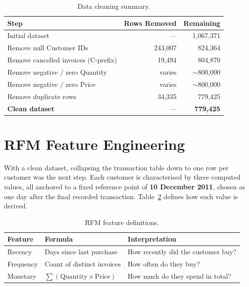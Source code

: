 \documentclass[12pt, a4paper]{article}
\begin{document}
\begin{table}[H]
\centering
\caption{Data cleaning summary.}
\label{tab:cleaning_summary}
\begin{tabular}{@{}lrr@{}}
\toprule
\textbf{Step} & \textbf{Rows Removed} & \textbf{Remaining} \\
\midrule
Initial dataset                      & ---       & 1,067,371 \\
Remove null Customer IDs             & 243,007   & 824,364   \\
Remove cancelled invoices (C-prefix) & 19,494    & 804,870   \\
Remove negative / zero Quantity      & varies    & $\sim$800,000 \\
Remove negative / zero Price         & varies    & $\sim$800,000 \\
Remove duplicate rows                & 34,335    & 779,425   \\
\midrule
\textbf{Clean dataset}              & ---       & \textbf{779,425} \\
\bottomrule
\end{tabular}
\end{table}

\section{RFM Feature Engineering}\label{sec:rfm}

With a clean dataset, collapsing the transaction table down to one row per customer was the next step. Each customer is characterised by three computed values, all anchored to a fixed reference point of \textbf{10 December 2011}, chosen as one day after the final recorded transaction. Table~\ref{tab:rfm_features} defines how each value is derived.

\begin{table}[H]
\centering
\caption{RFM feature definitions.}
\label{tab:rfm_features}
\begin{tabular}{@{}lll@{}}
\toprule
\textbf{Feature} & \textbf{Formula} & \textbf{Interpretation} \\
\midrule
Recency   & Days since last purchase  & How recently did the customer buy? \\
Frequency & Count of distinct invoices & How often do they buy? \\
Monetary  & $\sum (\text{Quantity} \times \text{Price})$ & How much do they spend in total? \\
\bottomrule
\end{tabular}
\end{table}
\end{document}
